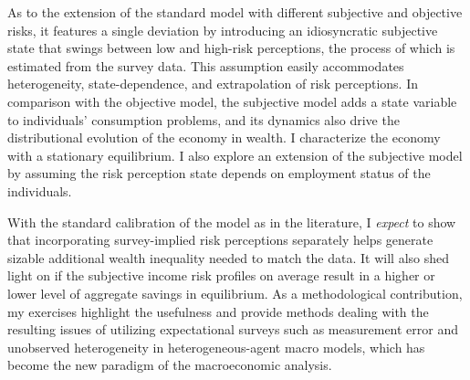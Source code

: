 As to the extension of the standard model with different subjective and objective risks, it features a single deviation by introducing an idiosyncratic subjective state that swings between low and high-risk perceptions, the process of which is estimated from the survey data. This assumption easily accommodates heterogeneity, state-dependence, and extrapolation of risk perceptions. In comparison with the objective model, the subjective model adds a state variable to individuals' consumption problems, and its dynamics also drive the distributional evolution of the economy in wealth. I characterize the economy with a stationary equilibrium. I also explore an extension of the subjective model by assuming the risk perception state depends on employment status of the individuals. 

With the standard calibration of the model as in the literature, I \emph{expect} to show that incorporating survey-implied risk perceptions separately helps generate sizable additional wealth inequality needed to match the data. It will also shed light on if the subjective income risk profiles on average result in a higher or lower level of aggregate savings in equilibrium. As a methodological contribution, my exercises highlight the usefulness and provide methods dealing with the resulting issues of utilizing expectational surveys such as measurement error and unobserved heterogeneity in heterogeneous-agent macro models, which has become the new paradigm of the macroeconomic analysis. 




